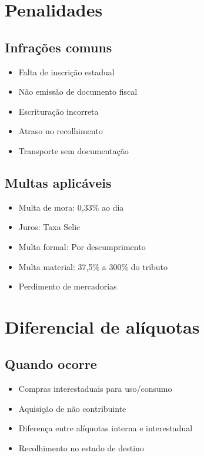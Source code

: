 \documentclass[12pt,a4paper]{article}
\begin{document}
\section{Penalidades}

\subsection{Infrações comuns}
\begin{itemize}
    \item Falta de inscrição estadual
    \item Não emissão de documento fiscal
    \item Escrituração incorreta
    \item Atraso no recolhimento
    \item Transporte sem documentação
\end{itemize}

\subsection{Multas aplicáveis}
\begin{itemize}
    \item Multa de mora: 0,33\% ao dia
    \item Juros: Taxa Selic
    \item Multa formal: Por descumprimento
    \item Multa material: 37,5\% a 300\% do tributo
    \item Perdimento de mercadorias
\end{itemize}

\section{Diferencial de alíquotas}

\subsection{Quando ocorre}
\begin{itemize}
    \item Compras interestaduais para uso/consumo
    \item Aquisição de não contribuinte
    \item Diferença entre alíquotas interna e interestadual
    \item Recolhimento no estado de destino
\end{itemize}
\end{document}
